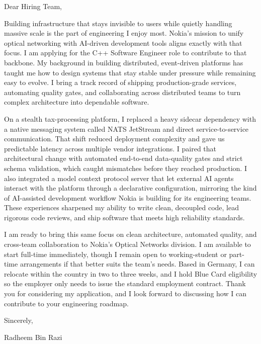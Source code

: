 \documentclass[11pt,a4paper]{coverletter}
\begin{document}

\opening{Dear Hiring Team,}

Building infrastructure that stays invisible to users while quietly handling massive scale is the part of engineering I enjoy most. Nokia’s mission to unify optical networking with AI-driven development tools aligns exactly with that focus. I am applying for the C++ Software Engineer role to contribute to that backbone. My background in building distributed, event-driven platforms has taught me how to design systems that stay stable under pressure while remaining easy to evolve. I bring a track record of shipping production-grade services, automating quality gates, and collaborating across distributed teams to turn complex architecture into dependable software.

On a stealth tax-processing platform, I replaced a heavy sidecar dependency with a native messaging system called NATS JetStream and direct service-to-service communication. That shift reduced deployment complexity and gave us predictable latency across multiple vendor integrations. I paired that architectural change with automated end-to-end data-quality gates and strict schema validation, which caught mismatches before they reached production. I also integrated a model context protocol server that let external AI agents interact with the platform through a declarative configuration, mirroring the kind of AI-assisted development workflow Nokia is building for its engineering teams. These experiences sharpened my ability to write clean, decoupled code, lead rigorous code reviews, and ship software that meets high reliability standards.

I am ready to bring this same focus on clean architecture, automated quality, and cross-team collaboration to Nokia’s Optical Networks division. I am available to start full-time immediately, though I remain open to working-student or part-time arrangements if that better suits the team’s needs. Based in Germany, I can relocate within the country in two to three weeks, and I hold Blue Card eligibility so the employer only needs to issue the standard employment contract. Thank you for considering my application, and I look forward to discussing how I can contribute to your engineering roadmap.

\closing{Sincerely,}{Radheem Bin Razi}

\clearpage
{}

\end{document}
